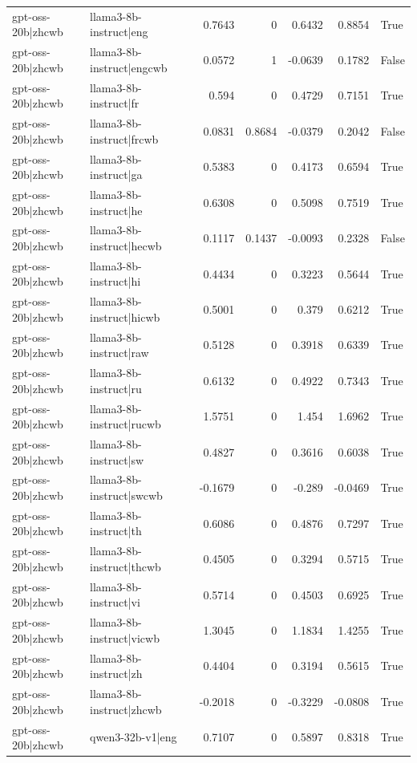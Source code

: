 \begin{table}
\begin{tabular}{l l r r r r l}
gpt-oss-20b|zhcwb & llama3-8b-instruct|eng & 0.7643 & 0 & 0.6432 & 0.8854 & True \\
gpt-oss-20b|zhcwb & llama3-8b-instruct|engcwb & 0.0572 & 1 & -0.0639 & 0.1782 & False \\
gpt-oss-20b|zhcwb & llama3-8b-instruct|fr & 0.594 & 0 & 0.4729 & 0.7151 & True \\
gpt-oss-20b|zhcwb & llama3-8b-instruct|frcwb & 0.0831 & 0.8684 & -0.0379 & 0.2042 & False \\
gpt-oss-20b|zhcwb & llama3-8b-instruct|ga & 0.5383 & 0 & 0.4173 & 0.6594 & True \\
gpt-oss-20b|zhcwb & llama3-8b-instruct|he & 0.6308 & 0 & 0.5098 & 0.7519 & True \\
gpt-oss-20b|zhcwb & llama3-8b-instruct|hecwb & 0.1117 & 0.1437 & -0.0093 & 0.2328 & False \\
gpt-oss-20b|zhcwb & llama3-8b-instruct|hi & 0.4434 & 0 & 0.3223 & 0.5644 & True \\
gpt-oss-20b|zhcwb & llama3-8b-instruct|hicwb & 0.5001 & 0 & 0.379 & 0.6212 & True \\
gpt-oss-20b|zhcwb & llama3-8b-instruct|raw & 0.5128 & 0 & 0.3918 & 0.6339 & True \\
gpt-oss-20b|zhcwb & llama3-8b-instruct|ru & 0.6132 & 0 & 0.4922 & 0.7343 & True \\
gpt-oss-20b|zhcwb & llama3-8b-instruct|rucwb & 1.5751 & 0 & 1.454 & 1.6962 & True \\
gpt-oss-20b|zhcwb & llama3-8b-instruct|sw & 0.4827 & 0 & 0.3616 & 0.6038 & True \\
gpt-oss-20b|zhcwb & llama3-8b-instruct|swcwb & -0.1679 & 0 & -0.289 & -0.0469 & True \\
gpt-oss-20b|zhcwb & llama3-8b-instruct|th & 0.6086 & 0 & 0.4876 & 0.7297 & True \\
gpt-oss-20b|zhcwb & llama3-8b-instruct|thcwb & 0.4505 & 0 & 0.3294 & 0.5715 & True \\
gpt-oss-20b|zhcwb & llama3-8b-instruct|vi & 0.5714 & 0 & 0.4503 & 0.6925 & True \\
gpt-oss-20b|zhcwb & llama3-8b-instruct|vicwb & 1.3045 & 0 & 1.1834 & 1.4255 & True \\
gpt-oss-20b|zhcwb & llama3-8b-instruct|zh & 0.4404 & 0 & 0.3194 & 0.5615 & True \\
gpt-oss-20b|zhcwb & llama3-8b-instruct|zhcwb & -0.2018 & 0 & -0.3229 & -0.0808 & True \\
gpt-oss-20b|zhcwb & qwen3-32b-v1|eng & 0.7107 & 0 & 0.5897 & 0.8318 & True \\

\end{tabular}
\end{table}
